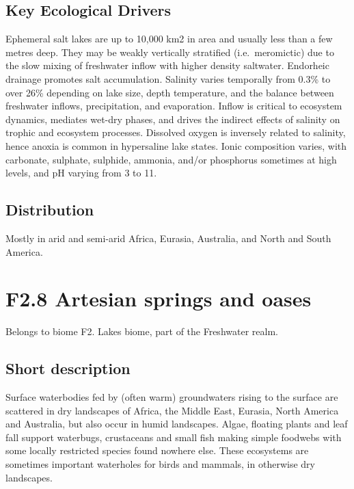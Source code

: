 \documentclass[
  letterpaper,
  DIV=11,
  numbers=noendperiod]{scrartcl}
\begin{document}
\subsection{Key Ecological Drivers}\label{key-ecological-drivers-123}

Ephemeral salt lakes are up to 10,000 km2 in area and usually less than
a few metres deep. They may be weakly vertically stratified
(i.e.~meromictic) due to the slow mixing of freshwater inflow with
higher density saltwater. Endorheic drainage promotes salt accumulation.
Salinity varies temporally from 0.3\% to over 26\% depending on lake
size, depth temperature, and the balance between freshwater inflows,
precipitation, and evaporation. Inflow is critical to ecosystem
dynamics, mediates wet-dry phases, and drives the indirect effects of
salinity on trophic and ecosystem processes. Dissolved oxygen is
inversely related to salinity, hence anoxia is common in hypersaline
lake states. Ionic composition varies, with carbonate, sulphate,
sulphide, ammonia, and/or phosphorus sometimes at high levels, and pH
varying from 3 to 11.

\subsection{Distribution}\label{distribution-123}

Mostly in arid and semi-arid Africa, Eurasia, Australia, and North and
South America.

\section{F2.8 Artesian springs and
oases}\label{f2.8-artesian-springs-and-oases-1}

Belongs to biome F2. Lakes biome, part of the Freshwater realm.

\subsection{Short description}\label{short-description-124}

Surface waterbodies fed by (often warm) groundwaters rising to the
surface are scattered in dry landscapes of Africa, the Middle East,
Eurasia, North America and Australia, but also occur in humid
landscapes. Algae, floating plants and leaf fall support waterbugs,
crustaceans and small fish making simple foodwebs with some locally
restricted species found nowhere else. These ecosystems are sometimes
important waterholes for birds and mammals, in otherwise dry landscapes.
\end{document}
